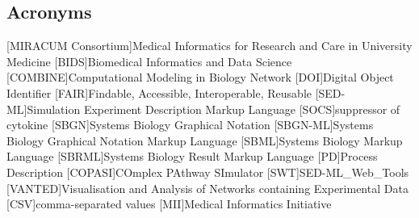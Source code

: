 \subsection*{Acronyms}
    \begin{acronym}[acrmeta]
        [MIRACUM Consortium]{Medical Informatics for Research and Care in University
Medicine}
        [BIDS]{Biomedical Informatics and Data Science}
        [COMBINE]{Computational Modeling in Biology Network}
        [DOI]{Digital Object Identifier}
        [FAIR]{Findable, Accessible, Interoperable, Reusable}
        [SED-ML]{Simulation Experiment Description Markup Language}
        [SOCS]{suppressor of cytokine}
        [SBGN]{Systems Biology Graphical Notation}
        [SBGN-ML]{Systems Biology Graphical Notation Markup Language}
        [SBML]{Systems Biology Markup Language}
        [SBRML]{Systems Biology Result Markup Language}
        [PD]{Process Description}
        [COPASI]{COmplex PAthway SImulator}
        [SWT]{SED-ML\_Web\_Tools}
        [VANTED]{Visualisation and Analysis of Networks containing Experimental Data}
        [CSV]{comma-separated values}
        [MII]{Medical Informatics Initiative}
    \end{acronym}